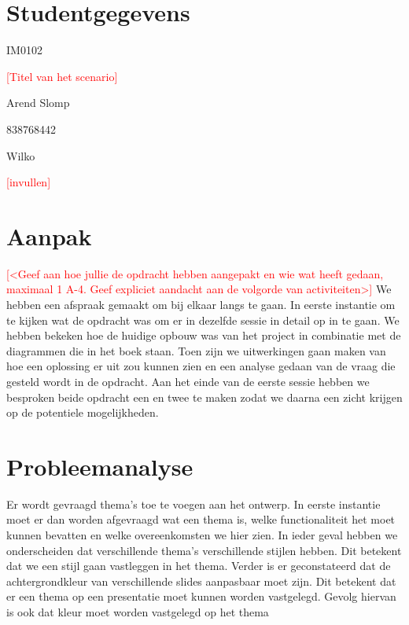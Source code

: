 \documentclass[a4paper]{article}
\newcommand{\todo}[1]{\textcolor{red}{[#1]}}
\begin{document}
\pagestyle{fancy}

\section*{Studentgegevens}
\begin{description}
	\item [Cursuscode] IM0102
	\item \todo{Titel van het scenario}
	\item [Naam] Arend Slomp
	\item [Studentnummer] 838768442
	\item [Naam] Wilko
	\item [Studentnummer] \todo{invullen}
\end{description}

\section*{Aanpak}
\todo{<Geef aan hoe jullie de opdracht hebben aangepakt en wie wat heeft gedaan, maximaal 1 A-4. Geef expliciet aandacht aan de volgorde van activiteiten>}
We hebben een afspraak gemaakt om bij elkaar langs te gaan. In eerste instantie om te kijken wat de opdracht was om er in dezelfde sessie in detail op in te gaan. We hebben bekeken hoe de huidige opbouw was van het project in combinatie met de diagrammen die in het boek staan. Toen zijn we uitwerkingen gaan maken van hoe een oplossing er uit zou kunnen zien en een analyse gedaan van de vraag die gesteld wordt in de opdracht.
Aan het einde van de eerste sessie hebben we besproken beide opdracht een en twee te maken zodat we daarna een zicht krijgen op de potentiele mogelijkheden.


\section{Probleemanalyse}
Er wordt gevraagd thema's toe te voegen aan het ontwerp.
In eerste instantie moet er dan worden afgevraagd wat een thema is, welke functionaliteit het moet kunnen bevatten en welke overeenkomsten we hier zien.
In ieder geval hebben we onderscheiden dat verschillende thema's verschillende stijlen hebben. Dit betekent dat we een stijl gaan vastleggen in het thema.
Verder is er geconstateerd dat de achtergrondkleur van verschillende slides aanpasbaar moet zijn.
Dit betekent dat er een thema op een presentatie moet kunnen worden vastgelegd. Gevolg hiervan is ook dat kleur moet worden vastgelegd op het thema
\end{document}
